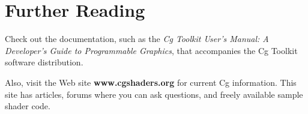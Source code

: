 \documentclass[../main.tex]{subfiles}
\begin{document}
\section{Further Reading}

Check out the documentation, such as the \textit{Cg Toolkit User's Manual: A Developer's Guide to Programmable Graphics}, that accompanies the Cg Toolkit software distribution.

Also, visit the Web site \textbf{www.cgshaders.org} for current Cg information. This site has articles, forums where you can ask questions, and freely available sample shader code.
\end{document}

